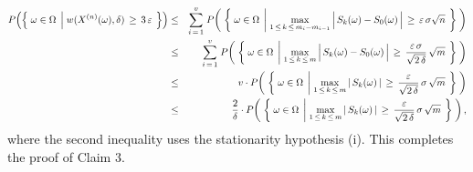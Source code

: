 \begin{eqnarray*}
P\!\left(\left\{\;
	\omega\in\Omega
	\;\left\vert\;
		\overset{{\color{white}1}}{w}(X^{(n)}(\omega),\delta)\,\geq\,3\,\varepsilon
	\right.
\;\right\}\right)
&\leq& \overset{v}{\underset{i\,=\,1}{\sum}}\;
	P\!\left(\;\left\{\; \omega\in\Omega \;\left\vert\;
		\underset{1\,\leq\,k\,\leq\,m_{i}-m_{i-1}}{\max}
			\left\vert\, S_{k}(\omega) \overset{{\color{white}.}}{-} S_{0}(\omega) \,\right\vert
		\,\geq\,\varepsilon\,\sigma\sqrt{n}
		\right.\;\right\}
		\;\right)
\\
&\leq& \overset{v}{\underset{i\,=\,1}{\sum}}\;
	P\!\left(\;\left\{\; \omega\in\Omega \;\left\vert\;
		\underset{1\,\leq\,k\,\leq\,m}{\max}
			\left\vert\, S_{k}(\omega) \overset{{\color{white}.}}{-} S_{0}(\omega) \,\right\vert
		\,\geq\,\dfrac{\varepsilon\,\sigma}{\sqrt{2\,\delta}}\,\sqrt{m}
		\right.\;\right\}
		\;\right)
\\
&\leq&
	v \cdot
	P\!\left(\;\left\{\; \omega\in\Omega \;\left\vert\;
		\underset{1\,\leq\,k\,\leq\,m}{\max}
			\left\vert\, S_{k}(\omega) \,\right\vert
		\,\geq\,\dfrac{\varepsilon}{\sqrt{2\,\delta}}\,\sigma\,\sqrt{m}
		\right.\;\right\}
		\;\right)
\\
&\leq&
	\dfrac{2}{\delta} \cdot
	P\!\left(\;\left\{\; \omega\in\Omega \;\left\vert\;
		\underset{1\,\leq\,k\,\leq\,m}{\max}
			\left\vert\, S_{k}(\omega) \,\right\vert
		\,\geq\,\dfrac{\varepsilon}{\sqrt{2\,\delta}}\,\sigma\,\sqrt{m}
		\right.\;\right\}
		\;\right),
\end{eqnarray*}
where the second inequality uses the stationarity hypothesis (i).
This completes the proof of Claim 3.

